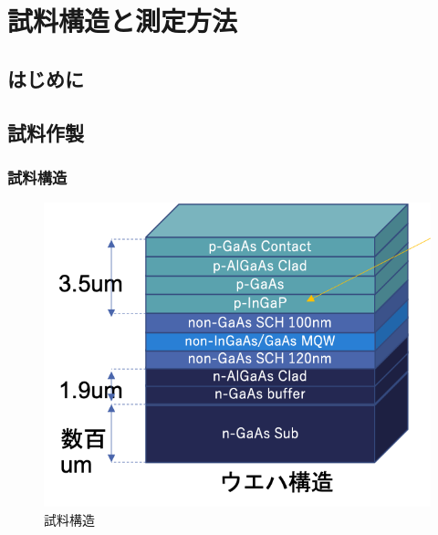 
\chapter{試料構造と測定方法}

\section{はじめに}

\section{試料作製}
\subsection{試料構造}
\begin{figure}[htbp]
	\includegraphics[width=15cm]{figure/fig_sample_structure}
	\caption{試料構造}
	\label{fig:sample_structure}
\end{figure}
